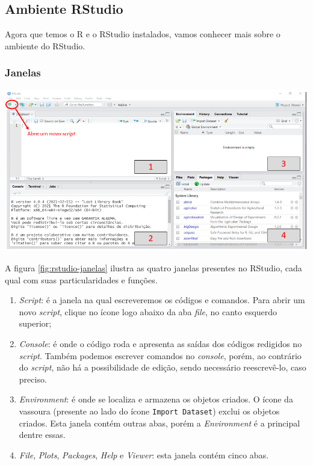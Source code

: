 \documentclass[
  brazilian,
]{book}
\let\origfigure\figure
\let\endorigfigure\endfigure
\renewenvironment{figure}[1][2] {
    \expandafter\origfigure\expandafter[H]
} {
    \endorigfigure
}
\begin{document}
\hypertarget{rstudio}{%
\subsection{Ambiente RStudio}\label{rstudio}}

Agora que temos o R e o RStudio instalados, vamos conhecer mais sobre o ambiente do RStudio.

\hypertarget{janelas}{%
\subsubsection*{Janelas}\label{janelas}}

\begin{figure}

{\centering \includegraphics[width=0.9\linewidth]{imagens/rstudio_janelas_expl} 

}

\caption{O RStudio apresenta 4 janelas principais, algumas com abas específicas, cada qual apresentando funcionalidades particulares.}\label{fig:rstudio-janelas}
\end{figure}

A figura \ref{fig:rstudio-janelas} ilustra as quatro janelas presentes no RStudio, cada qual com suas particularidades e funções.

\begin{enumerate}
\def\labelenumi{\arabic{enumi}.}
\item
  \emph{Script}: é a janela na qual escreveremos os códigos e comandos. Para abrir um novo \emph{script}, clique no ícone logo abaixo da aba \emph{file}, no canto esquerdo superior;
\item
  \emph{Console}: é onde o código roda e apresenta as saídas dos códigos redigidos no \emph{script}. Também podemos escrever comandos no \emph{console}, porém, ao contrário do \emph{script}, não há a possibilidade de edição, sendo necessário reescrevê-lo, caso preciso.
\item
  \emph{Environment}: é onde se localiza e armazena os objetos criados. O ícone da vassoura (presente ao lado do ícone \texttt{Import\ Dataset}) exclui os objetos criados. Esta janela contém outras abas, porém a \emph{Environment} é a principal dentre essas.
\item
  \emph{File}, \emph{Plots}, \emph{Packages}, \emph{Help} e \emph{Viewer}: esta janela contém cinco abas.
\end{enumerate}
\end{document}
